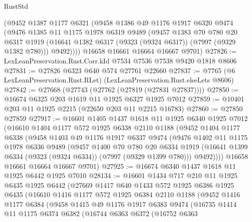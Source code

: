 \begin{lexlean}{RustStd}
\begin{coremodule}
      (@9452
        @1387
        @1177
        @6321
        (@9458
          @1386
          @49
          @1176
          @1917
          @6320
          @9474
          (@9476
            @1385
            @11
            @1175
            @1978
            @6319
            @9489
            (@9457
              @1383
              @70
              @780
              @20
              @6317
              @1919
              (@16641 @1382 @6317 (@9323 (@9324 @6317)) (@7997 (@9329 @1382 @780)))
              @9492))))
      @16658
      @16661
      @16664
      @16667
      @9701)
@27826 := LexLeanPreservation.Rust.Corr.kId @7534 @7536 @7538 @9420 @1818 @8606
@27831 := @27826 @6323 @640 @574 @27761 @22660
@27837 := @7765 (@6 LexLeanPreservation.Rust.RLet) (LexLeanPreservation.Rust.elseLets @8606)
@27842 := @27668 (@27743 (@27762 (@27819 (@27831 @27837))))
@27850 := @16674 @6325 @203 @1619 @11 @1925 @6327 @1925 @7012
@27859 := @10401 @203 @11 @1925 @2215 (@22650 @203 @11 @2215 @16783)
@27860 := @27850 @27859
@27917 := @16601
    @1405
    @1437
    @1618
    @11
    @1925
    @6340
    @1925
    @7012
    (@16610
      @1404
      @1177
      @572
      @1925
      @6338
      @2110
      @1188
      (@9452
        @1404
        @1177
        @6338
        (@9458
          @1403
          @49
          @1176
          @1917
          @6337
          @9474
          (@9476
            @1402
            @11
            @1175
            @1978
            @6336
            @9489
            (@9457
              @1400
              @70
              @780
              @20
              @6334
              @1919
              (@16641 @1399 @6334 (@9323 (@9324 @6334)) (@7997 (@9329 @1399 @780)))
              @9492))))
      @16658
      @16661
      @16664
      @16667
      @9701)
@27925 := @16674 @6340 @1437 @1618 @11 @1925 @6442 @1925 @7010
@28134 := @16601
    @1434
    @717
    @210
    @11
    @1925
    @6435
    @1925
    @6442
    (@27669
      @1417
      @640
      @1433
      @572
      @1925
      @6386
      @1925
      @6435
      (@16610
        @1416
        @1177
        @572
        @1925
        @6384
        @2110
        @1188
        (@9452
          @1416
          @1177
          @6384
          (@9458
            @1415
            @49
            @1176
            @1917
            @6383
            @9474
            (@16735
              @1414
              @11
              @1175
              @6374
              @6382
              (@16744
                @6363
                @6372
                (@16752
                  @6363

\end{coremodule}
\end{lexlean}
